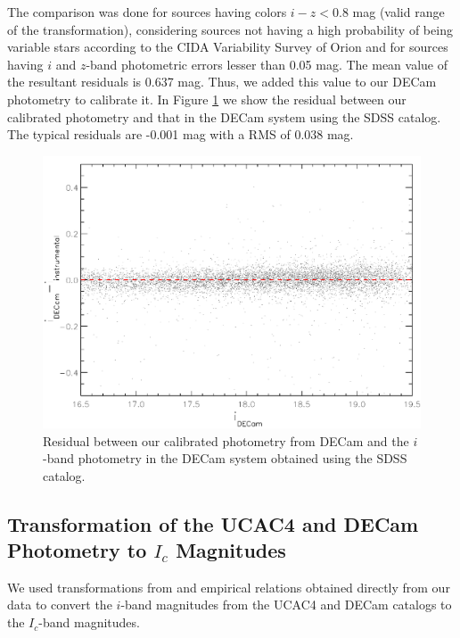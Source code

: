 \documentclass[12pt]{article}
\begin{document}
The comparison was done for sources having colors $i-z<0.8$ mag (valid range of the transformation), considering sources not having a high probability of being variable stars according to the CIDA Variability Survey of Orion \citep[][]{Briceno2005,Mateu2012,Briceno2018} and for sources having $i$ and $z$-band photometric errors lesser than 0.05 mag. The mean value of the resultant residuals is 0.637 mag. Thus, we added this value to our DECam photometry to calibrate it. In Figure \ref{fig_IMF:DECam_instrumental} we show the residual between our calibrated photometry and that in the DECam system using the SDSS catalog. The typical residuals are -0.001 mag with a RMS of 0.038 mag.

\begin{figure}[ht!]
	\begin{minipage}{0.60\textwidth}
		\includegraphics[width=1.00\textwidth]{f_A1.pdf}
	\end{minipage} \hfill
	\begin{minipage}{0.35\textwidth}
		\caption[Calibration of the DECam photometry.]{Residual between our calibrated photometry from DECam and the $i$-band photometry in the DECam system obtained using the SDSS catalog.}
		\label{fig_IMF:DECam_instrumental}
	\end{minipage}
\end{figure}

\subsection[Photometry Transformation]{Transformation of the UCAC4 and DECam Photometry to $I_c$ Magnitudes}
\label{sec_app_IMF:photometry_transformation}
We used transformations from \citet{Jordi2006} and empirical relations obtained directly from our data to convert the $i$-band magnitudes from the UCAC4 and DECam catalogs to the $I_c$-band magnitudes.
\end{document}
